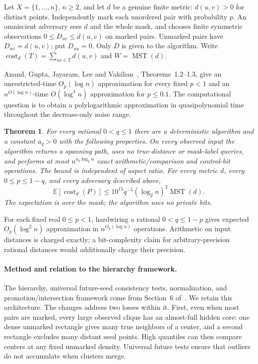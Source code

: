 \documentclass[acmsmall,11pt,nonacm]{acmart}
\newtheorem{theorem}{Theorem}
\theoremstyle{definition}
\newcommand{\MST}{\operatorname{MST}}
\newcommand{\cost}{\operatorname{cost}}
\begin{document}
Let $X=\{1,\ldots,n\}$, $n\geq2$, and let $d$ be a genuine finite metric:
$d(u,v)>0$ for distinct points. Independently mark each unordered pair with
probability $p$. An omniscient adversary sees $d$ and the whole mask, and
chooses finite symmetric observations $0\leq D_{uv}\leq d(u,v)$ on marked
pairs. Unmarked pairs have $D_{uv}=d(u,v)$; put $D_{uu}=0$.
Only $D$ is given to the algorithm. Write
$\cost_d(T)=\sum_{uv\in T}d(u,v)$ and $W=\MST(d)$.

Anand, Gupta, Jayaram, Lee and Vakilian~\cite{anand2026}, Theorems~1.2--1.3,
give an unrestricted-time $O_p(\log n)$ approximation for every fixed $p<1$
and an $n^{O(\log n)}$-time $O(\log^4 n)$ approximation for $p\leq0.1$.
The computational question is to obtain a polylogarithmic approximation
in quasipolynomial time throughout the decrease-only noise range.

\begin{theorem}\label{thm:main}
For every rational $0<q\leq1$ there are a deterministic algorithm and a
constant $a_q>0$ with the following properties. On every observed input
the algorithm returns a spanning path, uses no true-distance or mask-label
queries, and performs at most $n^{a_q\log_2 n}$ exact arithmetic/comparison
and control-bit operations. The bound is independent of aspect ratio.
For every metric $d$, every $0\leq p\leq1-q$, and every adversary described
above,
\[
 \mathbb E[\cost_d(P)]\leq 10^{15}q^{-5}(\log_2 n)^2\MST(d).
\]
The expectation is over the mask; the algorithm uses no private bits.
\end{theorem}

For each fixed real $0\leq p<1$, hardwiring a rational $0<q\leq1-p$
gives expected $O_p(\log^2 n)$ approximation in $n^{O_p(\log n)}$ operations.
Arithmetic on input distances is charged exactly; a bit-complexity claim
for arbitrary-precision rational distances would additionally charge their
precision.

\paragraph{Method and relation to the hierarchy framework.}
The hierarchy, universal future-seed consistency tests, normalization, and
promotion/intersection framework come from Section~6 of~\cite{anand2026}.
We retain this architecture. The changes address two losses within it.
First, even when most pairs are marked, every large observed clique has
an almost-full hidden core: one dense unmarked rectangle gives many true
neighbors of a center, and a second rectangle excludes many distant seed
points. High quantiles can then compare centers at any fixed unmarked
density. Universal future tests ensure that outliers do not accumulate
when clusters merge.
\end{document}
